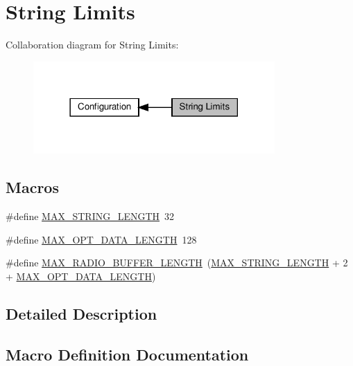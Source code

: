 \hypertarget{group__defines__string__memory__limits}{}\section{String Limits}
\label{group__defines__string__memory__limits}
Collaboration diagram for String Limits\+:
\nopagebreak
\begin{figure}[H]
\begin{center}
\leavevmode
\includegraphics[width=261pt]{group__defines__string__memory__limits}
\end{center}
\end{figure}
\subsection*{Macros}
\begin{DoxyCompactItemize}
\item 
\#define \hyperlink{group__defines__string__memory__limits_ga6789ebc0df71a8ef76bfbb4fb5f74aad}{M\+A\+X\+\_\+\+S\+T\+R\+I\+N\+G\+\_\+\+L\+E\+N\+G\+TH}~32
\item 
\#define \hyperlink{group__defines__string__memory__limits_gae4e308c6dc1882b7571c0eef47e07800}{M\+A\+X\+\_\+\+O\+P\+T\+\_\+\+D\+A\+T\+A\+\_\+\+L\+E\+N\+G\+TH}~128
\item 
\#define \hyperlink{group__defines__string__memory__limits_ga03d448ca7b11d1c3e1768aebdda93af2}{M\+A\+X\+\_\+\+R\+A\+D\+I\+O\+\_\+\+B\+U\+F\+F\+E\+R\+\_\+\+L\+E\+N\+G\+TH}~(\hyperlink{group__defines__string__memory__limits_ga6789ebc0df71a8ef76bfbb4fb5f74aad}{M\+A\+X\+\_\+\+S\+T\+R\+I\+N\+G\+\_\+\+L\+E\+N\+G\+TH} + 2 + \hyperlink{group__defines__string__memory__limits_gae4e308c6dc1882b7571c0eef47e07800}{M\+A\+X\+\_\+\+O\+P\+T\+\_\+\+D\+A\+T\+A\+\_\+\+L\+E\+N\+G\+TH})
\end{DoxyCompactItemize}


\subsection{Detailed Description}


\subsection{Macro Definition Documentation}
\mbox{\label{group__defines__string__memory__limits_gae4e308c6dc1882b7571c0eef47e07800}} 
